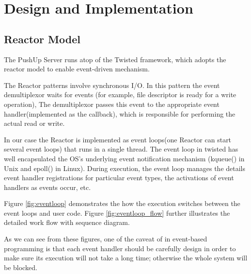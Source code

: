 \section {Design and Implementation\\}

\subsection{Reactor Model\\}
The PushUp Server runs atop of the Twisted framework\cite{Twisted}, which 
adopts the reactor model\cite{Reactor} to enable event-driven mechanism. 

The Reactor patterns involve synchronous I/O. In this pattern the event 
demultiplexor waits for events (for example, file descriptor is 
ready for a write operation), The demultiplexor passes this event to the
appropriate event handler(implemented as the callback), which is 
responsible for performing the actual read or write.

In our case the Reactor is implemented as event loops(one Reactor 
can start several event loops) that runs in a single thread. The
event loop in twisted has well encapsulated the OS's underlying 
event notification mechanism (kqueue() in Unix and epoll() in Linux).
During execution, the event loop manages the details event handler 
registrations for particular event types, the activations of event 
handlers as events occur, etc.

Figure \ref{fig:eventloop} demonstrates the how the execution switches
between the event loops and user code. Figure \ref{fig:eventloop_flow} 
further illustrates the detailed work flow with sequence diagram.

As we can see from these figures, one of the caveat of in 
event-based programming is that each event handler should 
be carefully design in order to make sure its execution 
will not take a long time; otherwise the whole system will 
be blocked.

